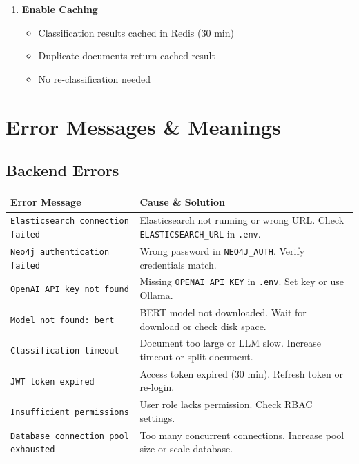 \begin{enumerate}
    \item \textbf{Enable Caching}
    \begin{itemize}
        \item Classification results cached in Redis (30 min)
        \item Duplicate documents return cached result
        \item No re-classification needed
    \end{itemize}
\end{enumerate}

\section{Error Messages \& Meanings}

\subsection{Backend Errors}

\begin{table}[h]
\centering
\caption{Common Backend Error Messages}
\begin{longtable}{p{}p{}}
\toprule
\textbf{Error Message} & \textbf{Cause \& Solution} \\
\midrule
\texttt{Elasticsearch connection failed} & 
Elasticsearch not running or wrong URL. Check \texttt{ELASTICSEARCH\_URL} in \texttt{.env}. \\
\addlinespace
\texttt{Neo4j authentication failed} & 
Wrong password in \texttt{NEO4J\_AUTH}. Verify credentials match. \\
\addlinespace
\texttt{OpenAI API key not found} & 
Missing \texttt{OPENAI\_API\_KEY} in \texttt{.env}. Set key or use Ollama. \\
\addlinespace
\texttt{Model not found: bert} & 
BERT model not downloaded. Wait for download or check disk space. \\
\addlinespace
\texttt{Classification timeout} & 
Document too large or LLM slow. Increase timeout or split document. \\
\addlinespace
\texttt{JWT token expired} & 
Access token expired (30 min). Refresh token or re-login. \\
\addlinespace
\texttt{Insufficient permissions} & 
User role lacks permission. Check RBAC settings. \\
\addlinespace
\texttt{Database connection pool exhausted} & 
Too many concurrent connections. Increase pool size or scale database. \\
\bottomrule
\end{longtable}
\end{table}

